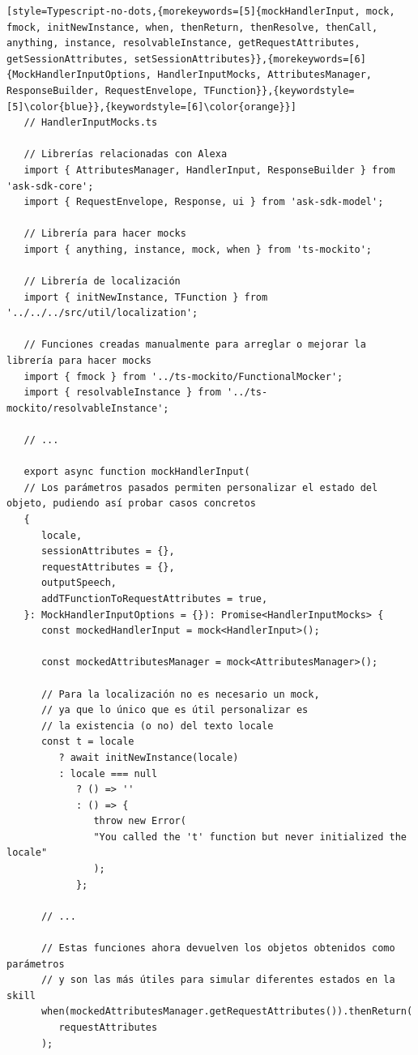 \documentclass[11pt,spanish,listoffigures,listoftables,table,hyphens,dvipsnames]{tfgetsinf}
\begin{document}
\begin{lstlisting}[style=Typescript-no-dots,{morekeywords=[5]{mockHandlerInput, mock, fmock, initNewInstance, when, thenReturn, thenResolve, thenCall, anything, instance, resolvableInstance, getRequestAttributes, getSessionAttributes, setSessionAttributes}},{morekeywords=[6]{MockHandlerInputOptions, HandlerInputMocks, AttributesManager, ResponseBuilder, RequestEnvelope, TFunction}},{keywordstyle=[5]\color{blue}},{keywordstyle=[6]\color{orange}}]
   // HandlerInputMocks.ts

   // Librerías relacionadas con Alexa
   import { AttributesManager, HandlerInput, ResponseBuilder } from 'ask-sdk-core';
   import { RequestEnvelope, Response, ui } from 'ask-sdk-model';

   // Librería para hacer mocks
   import { anything, instance, mock, when } from 'ts-mockito';
   
   // Librería de localización
   import { initNewInstance, TFunction } from '../../../src/util/localization';

   // Funciones creadas manualmente para arreglar o mejorar la librería para hacer mocks
   import { fmock } from '../ts-mockito/FunctionalMocker';
   import { resolvableInstance } from '../ts-mockito/resolvableInstance';

   // ...

   export async function mockHandlerInput(
   // Los parámetros pasados permiten personalizar el estado del objeto, pudiendo así probar casos concretos 
   {
      locale,
      sessionAttributes = {},
      requestAttributes = {},
      outputSpeech,
      addTFunctionToRequestAttributes = true,
   }: MockHandlerInputOptions = {}): Promise<HandlerInputMocks> {     
      const mockedHandlerInput = mock<HandlerInput>();

      const mockedAttributesManager = mock<AttributesManager>();

      // Para la localización no es necesario un mock,
      // ya que lo único que es útil personalizar es
      // la existencia (o no) del texto locale
      const t = locale
         ? await initNewInstance(locale)
         : locale === null
            ? () => ''
            : () => {
               throw new Error(
               "You called the 't' function but never initialized the locale"
               );
            };

      // ...

      // Estas funciones ahora devuelven los objetos obtenidos como parámetros
      // y son las más útiles para simular diferentes estados en la skill
      when(mockedAttributesManager.getRequestAttributes()).thenReturn(
         requestAttributes
      );


\end{lstlisting}
\end{document}
